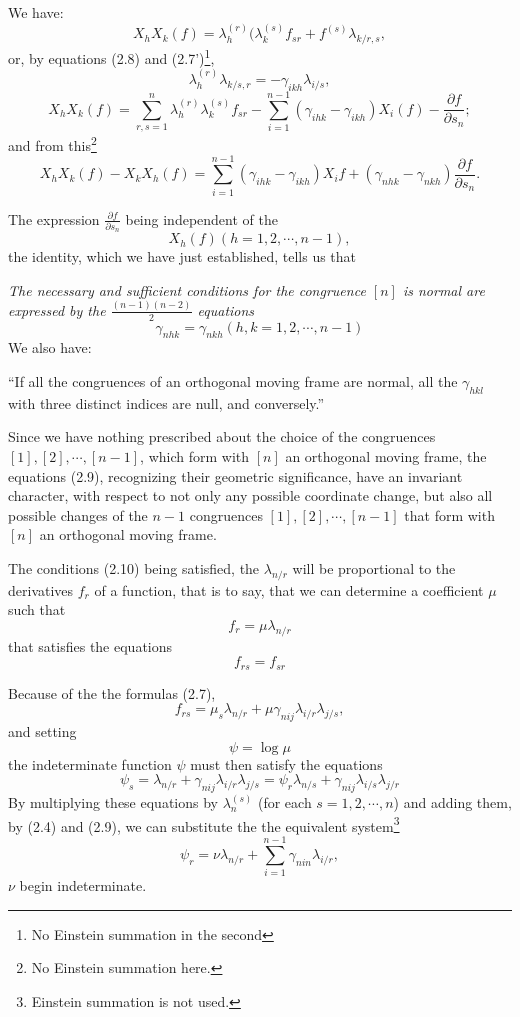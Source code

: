 \documentclass{book}
\begin{document}
We have:
$$X_hX_k(f)=\lambda_h^{(r)}(\lambda_k^{(s)}f_{sr}+f^{(s)}\lambda_{k/r,s},$$
or, by equations (2.8) and (2.7')\footnote{No Einstein summation in the second},
$$\lambda_h^{(r)}\lambda_{k/s,r}=-\gamma_{ikh}\lambda_{i/s},$$
$$X_hX_k(f)=\sum_{r,s=1}^n\lambda_h^{(r)}\lambda_k^{(s)}f_{sr}-\sum_{i=1}^{n-1}(\gamma_{ihk}-\gamma_{ikh})X_i(f)-\frac{\partial f}{\partial s_n};$$
and from this\footnote{No Einstein summation here.}
$$X_hX_k(f)-X_kX_h(f)=\sum_{i=1}^{n-1}(\gamma_{ihk}-\gamma_{ikh})X_i{f}+(\gamma_{nhk}-\gamma_{nkh})\frac{\partial f}{\partial s_n}.$$

The expression $\displaystyle\frac{\partial f}{\partial s_n}$ being independent of the
$$X_h(f) (h=1,2,\cdots,n-1),$$
the identity, which we have just established, tells us that

\emph{The necessary and sufficient conditions for the congruence $[n]$ is normal are expressed by the $\frac{(n-1)(n-2)}{2}$ equations}
\begin{equation}
\gamma_{nhk}=\gamma_{nkh} (h,k=1,2,\cdots,n-1)
\end{equation}
We also have:

``If all the congruences of an orthogonal moving frame are normal, all the $\gamma_{hkl}$ with three distinct indices are null, and conversely.''

Since we have nothing prescribed about the choice of the congruences \\$[1],[2],\cdots,[n-1]$, which form with $[n]$ an orthogonal moving frame, the equations (2.9), recognizing their geometric significance, have an invariant character, with respect to not only any possible coordinate change, but also all possible changes of the $n-1$ congruences $[1],[2],\cdots,[n-1]$ that form with $[n]$ an orthogonal moving frame. 

The conditions (2.10) being satisfied, the $\lambda_{n/r}$ will be proportional to the derivatives $f_r$ of a function, that is to say, that we can determine a coefficient $\mu$ such that
$$f_r=\mu\lambda_{n/r}$$
that satisfies the equations
$$f_{rs}=f_{sr}$$

Because of the the formulas (2.7),
\begin{equation}
f_{rs}=\mu_s\lambda_{n/r}+\mu\gamma_{nij}\lambda_{i/r}\lambda_{j/s},
\end{equation}
and setting
\begin{equation}
\psi=\log\mu
\end{equation}
the indeterminate function $\psi$ must then satisfy the equations
$$\psi_s=\lambda_{n/r}+\gamma_{nij}\lambda_{i/r}\lambda_{j/s}=\psi_r\lambda_{n/s}+\gamma_{nij}\lambda_{i/s}\lambda_{j/r}$$
By multiplying these equations by $\lambda_n^{(s)}$ (for each $s=1,2,\cdots,n$) and adding them, by (2.4) and (2.9), we can substitute the the equivalent system\footnote{Einstein summation is not used.}
\begin{equation}
\psi_r=\nu\lambda_{n/r}+\sum_{i=1}^{n-1}\gamma_{nin}\lambda_{i/r},
\end{equation}
$\nu$ begin indeterminate. 
\end{document}

